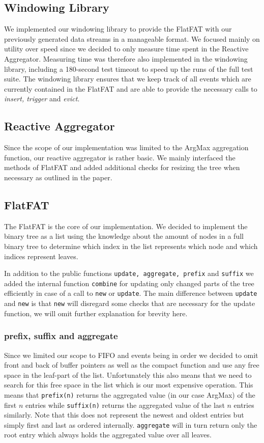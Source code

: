 \subsection{Windowing Library}
We implemented our windowing library to provide the FlatFAT with our previously generated
data streams in a manageable format. We focused mainly on utility over speed since we
decided to only measure time spent in the Reactive Aggregator.
Measuring time was therefore also implemented in the windowing library, including a
180-second test timeout to speed up the runs of the full test suite. The windowing library
ensures that we keep track of all events which are currently contained in the FlatFAT
and are able to provide the necessary calls to \textit{insert, trigger} and \textit{evict}.

\subsection{Reactive Aggregator}
Since the scope of our implementation was limited to the ArgMax aggregation function,
our reactive aggregator is rather basic. We mainly interfaced the methods of FlatFAT
and added additional checks for resizing the tree when necessary as outlined in the paper.

\subsection{FlatFAT}
The FlatFAT is the core of our implementation. We decided to implement the binary tree
as a list using the knowledge about the amount of nodes in a full binary tree to determine
which index in the list represents which node and which indices represent leaves.

In addition to the public functions \texttt{update, aggregate, prefix} and \texttt{suffix} we
added the internal function \texttt{combine} for updating only changed parts of the tree
efficiently in case of a call to \texttt{new} or \texttt{update}. The main difference between
\texttt{update} and \texttt{new} is that \texttt{new} will disregard some checks that are necessary for
the update function, we will omit further explanation for brevity here.

\subsubsection{prefix, suffix and aggregate}
Since we limited our scope to FIFO and events being in order we decided to omit
front and back of buffer pointers as well as the compact function and use any free
space in the leaf-part of the list. Unfortunately this also means that we need
to search for this free space in the list which is our most expensive operation.
This means that \texttt{prefix(n)} returns the aggregated value (in our case ArgMax) of the
first $n$ entries while \texttt{suffix(n)} returns the aggregated value of the last $n$ entries
similarly. Note that this does not represent the newest and oldest entries but simply
first and last as ordered internally.
\texttt{aggregate} will in turn return only the root entry which always holds the aggregated
value over all leaves.

